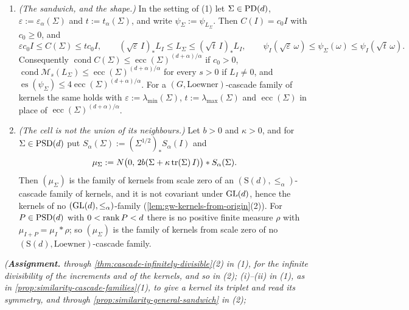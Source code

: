 \begin{proposition}
\begin{enumerate}
step $\Sigma \le_\alpha \Sigma'$ in $\PD(d)$ has the infinitely divisible increment $\mu_{\Sigma,\Sigma'}$.
For $G = \mathrm S(d)$ the isotropic members $\mu_I$ of these families are exactly the rotation-invariant
self-decomposable laws other than $\delta_0$.
\item \emph{(The sandwich, and the shape.)} In the setting of (1) let $\Sigma \in \mathrm{PD}(d)$,
$\varepsilon := \varepsilon_\alpha(\Sigma)$ and $t := t_\alpha(\Sigma)$, and write
$\psi_\Sigma := \psi_{L_\Sigma}$. Then $C(I) = c_0I$ with $c_0 \ge 0$, and
\[
  \varepsilon c_0I \le C(\Sigma) \le tc_0I , \qquad
  (\sqrt\varepsilon\,I)_*L_I \le L_\Sigma \le (\sqrt t\,I)_*L_I , \qquad
  \psi_I(\sqrt\varepsilon\,\omega) \le \psi_\Sigma(\omega) \le \psi_I(\sqrt t\,\omega) .
\]
Consequently $\operatorname{cond}C(\Sigma) \le \operatorname{ecc}(\Sigma)^{(d+\alpha)/\alpha}$ if $c_0 > 0$,
$\operatorname{cond}\mathcal M_s(L_\Sigma) \le \operatorname{ecc}(\Sigma)^{(d+\alpha)/\alpha}$ for every $s > 0$ if
$L_I \ne 0$, and $\operatorname{es}(\psi_\Sigma) \le 4\operatorname{ecc}(\Sigma)^{(d+\alpha)/\alpha}$. For a
$(G, \text{Loewner})$-cascade family of kernels the same holds with $\varepsilon := \lambda_{\min}(\Sigma)$,
$t := \lambda_{\max}(\Sigma)$ and $\operatorname{ecc}(\Sigma)$ in place of
$\operatorname{ecc}(\Sigma)^{(d+\alpha)/\alpha}$.
\item \emph{(The cell is not the union of its neighbours.)} Let $b > 0$ and $\kappa > 0$, and for
$\Sigma \in \mathrm{PSD}(d)$ put $S_\alpha(\Sigma) := (\Sigma^{1/2})_*S_\alpha(I)$ and
\[
  \mu_\Sigma := N\bigl(0,\, 2b(\Sigma + \kappa\operatorname{tr}(\Sigma)\,I)\bigr) * S_\alpha(\Sigma) .
\]
Then $(\mu_\Sigma)$ is the family of kernels from scale zero of an $(\mathrm S(d), \le_\alpha)$-cascade
family of kernels, and it is not covariant under $\mathrm{GL}(d)$, hence the kernels of no
$(\mathrm{GL}(d), \le_\alpha)$-family (\ref{lem:gw-kernels-from-origin}(2)). For $P \in \mathrm{PSD}(d)$ with $0 < \operatorname{rank} P < d$ there
is no positive finite measure $\rho$ with $\mu_{I+P} = \mu_I * \rho$; so $(\mu_\Sigma)$ is the family of
kernels from scale zero of no $(\mathrm S(d), \text{Loewner})$-cascade family.
\end{enumerate}
\statusA\quad{}\quad{}\quad\emph{(\textbf{Assignment.}  through
\ref{thm:cascade-infinitely-divisible}(2) in (1), for the infinite divisibility of the increments and of the
kernels, and so in (2); (i)--(ii) in (1), as in \ref{prop:similarity-cascade-families}(1), to
give a kernel its triplet and read its symmetry, and through \ref{prop:similarity-general-sandwich} in (2);
}
\end{proposition}
